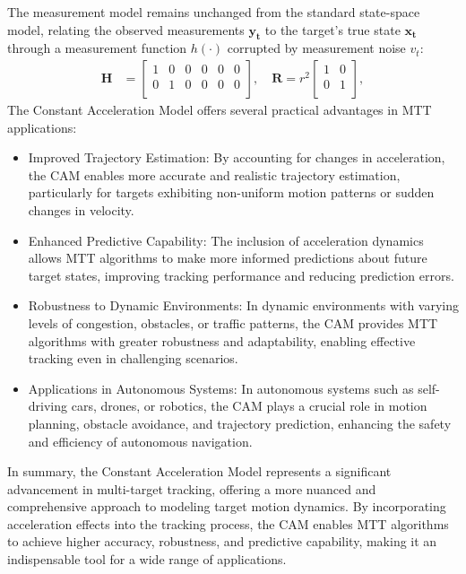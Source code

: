 The measurement model remains unchanged from the standard state-space model, relating the observed measurements $\mathbf{y_t}$ to the target's true state $\mathbf{x_t}$ through a measurement function $h(\cdot)$ corrupted by measurement noise $v_t$:
\begin{align}
    \mathbf{H} &=
    \begin{bmatrix}
        1 & 0 & 0 & 0 & 0 & 0 \\
        0 & 1 & 0 & 0 & 0 & 0 \\
    \end{bmatrix},
    \quad \mathbf{R} = r^2
    \begin{bmatrix}
        1 & 0  \\
        0 & 1  \\
    \end{bmatrix},
\end{align}
The Constant Acceleration Model offers several practical advantages in MTT applications:
\begin{itemize}
    \item Improved Trajectory Estimation: By accounting for changes in acceleration, the CAM enables more accurate and realistic trajectory estimation, particularly for targets exhibiting non-uniform motion patterns or sudden changes in velocity.
    \item Enhanced Predictive Capability: The inclusion of acceleration dynamics allows MTT algorithms to make more informed predictions about future target states, improving tracking performance and reducing prediction errors.
    \item Robustness to Dynamic Environments: In dynamic environments with varying levels of congestion, obstacles, or traffic patterns, the CAM provides MTT algorithms with greater robustness and adaptability, enabling effective tracking even in challenging scenarios.
    \item Applications in Autonomous Systems: In autonomous systems such as self-driving cars, drones, or robotics, the CAM plays a crucial role in motion planning, obstacle avoidance, and trajectory prediction, enhancing the safety and efficiency of autonomous navigation.
\end{itemize}
In summary, the Constant Acceleration Model represents a significant advancement in multi-target tracking, offering a
more nuanced and comprehensive approach to modeling target motion dynamics. By incorporating acceleration effects
into the tracking process, the CAM enables MTT algorithms to achieve higher accuracy, robustness, and predictive capability, making it an indispensable tool for a wide range of applications.

